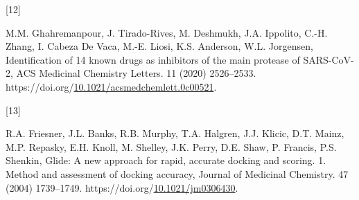 \documentclass[
]{article}
\newlength{\cslhangindent}
\newlength{\csllabelwidth}
\newlength{\cslentryspacingunit} %
\newenvironment{CSLReferences}[2] %
 {%
  \setlength{\parindent}{0pt}
  \ifodd #1
  \let\oldpar\par
  \def\par{\hangindent=\cslhangindent\oldpar}
  \fi
  \setlength{\parskip}{#2\cslentryspacingunit}
 }%
 {}
\newcommand{\CSLLeftMargin}[1]{\parbox[t]{\csllabelwidth}{#1}}
\newcommand{\CSLRightInline}[1]{\parbox[t]{\linewidth - \csllabelwidth}{#1}\break}
\begin{document}
\begin{CSLReferences}{0}{0}
\leavevmode{}%
\CSLLeftMargin{{[}12{]} }%
\CSLRightInline{M.M. Ghahremanpour, J. Tirado-Rives, M. Deshmukh, J.A.
Ippolito, C.-H. Zhang, I. Cabeza De Vaca, M.-E. Liosi, K.S. Anderson,
W.L. Jorgensen, Identification of 14 known drugs as inhibitors of the
main protease of SARS-CoV-2, ACS Medicinal Chemistry Letters. 11 (2020)
2526--2533.
https://doi.org/\href{https://doi.org/10.1021/acsmedchemlett.0c00521}{10.1021/acsmedchemlett.0c00521}.}

\leavevmode{}%
\CSLLeftMargin{{[}13{]} }%
\CSLRightInline{R.A. Friesner, J.L. Banks, R.B. Murphy, T.A. Halgren,
J.J. Klicic, D.T. Mainz, M.P. Repasky, E.H. Knoll, M. Shelley, J.K.
Perry, D.E. Shaw, P. Francis, P.S. Shenkin, Glide:{\hspace{0.167em}} A
new approach for rapid, accurate docking and scoring. 1. Method and
assessment of docking accuracy, Journal of Medicinal Chemistry. 47
(2004) 1739--1749.
https://doi.org/\href{https://doi.org/10.1021/jm0306430}{10.1021/jm0306430}.}

\end{CSLReferences}
\end{document}

